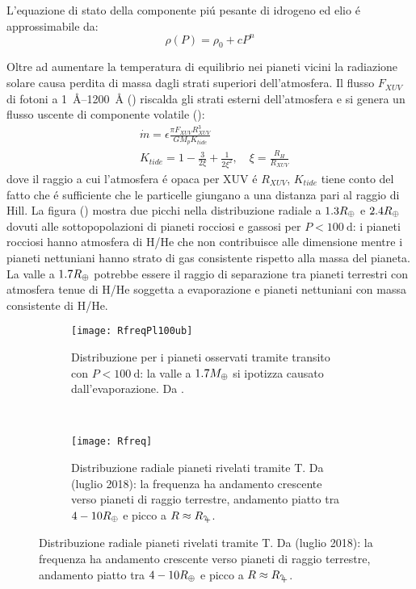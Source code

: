 L'equazione di stato della componente pi\'u pesante di idrogeno ed elio \'e approssimabile da:
\begin{equation}
\rho(P)=\rho_0+cP^n
\end{equation}

Oltre ad aumentare la temperatura di equilibrio nei pianeti vicini la radiazione solare causa perdita di massa dagli strati superiori dell'atmosfera. Il flusso $F_{XUV}$ di fotoni a \SIrange{1}{1200}{\angstrom} (\cite{ribas2005evolution}) riscalda gli strati esterni dell'atmosfera e si genera un flusso uscente di componente volatile (\cite{lopez2013role}):
\begin{align}
&\dot{m}=\epsilon\frac{\pi F_{XUV}R_{XUV}^3}{GM_pK_{tide}}\\
&K_{tide}=1-\frac{3}{2\xi}+\frac{1}{2\xi^2},\quad\xi=\frac{R_H}{R_{XUV}}
\end{align}
dove il raggio a cui l'atmosfera \'e opaca per XUV \'e $R_{XUV}$, $K_{tide}$ tiene conto del fatto che \'e sufficiente che le particelle giungano a una distanza pari al raggio di Hill.
La figura () mostra due picchi nella distribuzione radiale a $1.3R_{\oplus}{}$ e $2.4R_{\oplus}{}$ dovuti alle sottopopolazioni di pianeti rocciosi e gassosi per $P<\SI{100}{\day}$: i pianeti rocciosi hanno atmosfera di H/He che non contribuisce alle dimensione mentre i pianeti nettuniani hanno strato di gas consistente rispetto alla massa del pianeta. La valle a $1.7R_{\oplus}{}$ potrebbe essere il raggio di separazione tra pianeti terrestri con atmosfera tenue di H/He soggetta a evaporazione e pianeti nettuniani con massa consistente di H/He.

\begin{figure}[!ht]
\begin{subfigure}[b]{0.49\textwidth}
	\centering \texttt{[image: RfreqPl100ub]} 
	\caption{Distribuzione per i pianeti osservati tramite transito con $P<\SI{100}{\day}$: la valle a $1.7M_{\oplus}{}$ si ipotizza causato dall'evaporazione. Da \cite{fulton2017california}.}\label{fig:RfreqPl100ub}
\end{subfigure}
~
\begin{subfigure}[b]{0.49\textwidth}
	\centering\texttt{[image: Rfreq]}\caption{Distribuzione radiale pianeti rivelati tramite T. Da \cite{exoplanet.eu} (luglio 2018): la frequenza ha andamento crescente verso pianeti di raggio terrestre, andamento piatto tra $4-10R_{\oplus}{}$ e picco a $R\approx\rjupiter{}$.}\label{fig:probvsR-T}
\end{subfigure}
\end{figure}

